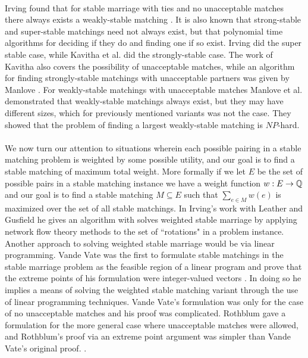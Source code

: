 \paragraph{}
Irving found that for stable marriage with ties and no unacceptable matches there always exists a weakly-stable matching \cite{irving1994stable}. It is also known that strong-stable and super-stable matchings need not always exist, but that polynomial time algorithms for deciding if they do and finding one if so exist. Irving did the super stable case, while Kavitha et al. \cite{kavitha2004strongly} did the strongly-stable case. The work of Kavitha also covers the possibility of unacceptable matches, while an algorithm for finding strongly-stable matchings with unacceptable partners was given by Manlove \cite{manlove1999stable}. For weakly-stable matchings with unacceptable matches Manlove et al. \cite{manlove2002hard} demonstrated that weakly-stable matchings always exist, but they may have different sizes, which for previously mentioned variants was not the case. They showed that the problem of finding a largest weakly-stable matching is $NP$-hard.
\paragraph{}
We now turn our attention to situations wherein each possible pairing in a stable matching problem is weighted by some possible utility, and our goal is to find a stable matching of maximum total weight. More formally if we let $E$ be the set of possible pairs in a stable matching instance we have a weight function $w : E \rightarrow \mathbb{Q}$ and our goal is to find a stable matching $M \subseteq E$ such that $\sum_{e\in M} w(e)$ is maximized over the set of all stable matchings. In Irving's work with Leather and Gusfield \cite{irving1987efficient} he gives an algorithm with solves weighted stable marriage by applying network flow theory methods to the set of ``rotations" in a problem instance. Another approach to solving weighted stable marriage would be via linear programming. Vande Vate was the first to formulate stable matchings in the stable marriage problem as the feasible region of a linear program and prove that the extreme points of his formulation were integer-valued vectors \cite{vate1989linear}. In doing so he implies a means of solving the weighted stable matching variant through the use of linear programming techniques. Vande Vate's formulation was only for the case of no unacceptable matches and his proof was complicated. Rothblum gave a formulation for the more general case where unacceptable matches were allowed, and Rothblum's proof via an extreme point argument was simpler than Vande Vate's original proof. \cite{rothblum1992characterization}.
